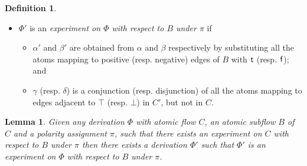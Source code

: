\documentclass[a4paper]{amsart}
\newtheorem{lem}[thm]{Lemma}
\theoremstyle{remark}
\theoremstyle{definition}
\newtheorem{defi}[thm]{Definition}
\begin{document}
\begin{defi}
\begin{itemize}
\item $\Phi'$ is an \emph{experiment on $\Phi$ with respect to $B$ under $\pi$} if
\begin{itemize}
 \item $\alpha'$ and $\beta'$ are obtained from $\alpha$ and $\beta$ respectively by substituting all the atoms mapping to positive (resp. negative) edges of $B$ with $\mathsf t$ (resp. $\mathsf f$); and
 \item $\gamma$ (resp. $\delta$) is a conjunction (resp. disjunction) of all the atoms mapping to edges adjacent to $\top$ (resp. $\bot$) in $C'$, but not in $C$.
\end{itemize}
\end{itemize}
\end{defi}

\begin{lem}
Given any derivation $\Phi$ with atomic flow $C$, an atomic subflow $B$ of $C$ and a polarity assignment $\pi$, such that there exists an experiment on $C$ with respect to $B$ under $\pi$ then there exists a derivation $\Phi'$ such that $\Phi'$ is an experiment on $\Phi$ with respect to $B$ under $\pi$.
\end{lem}
\end{document}
